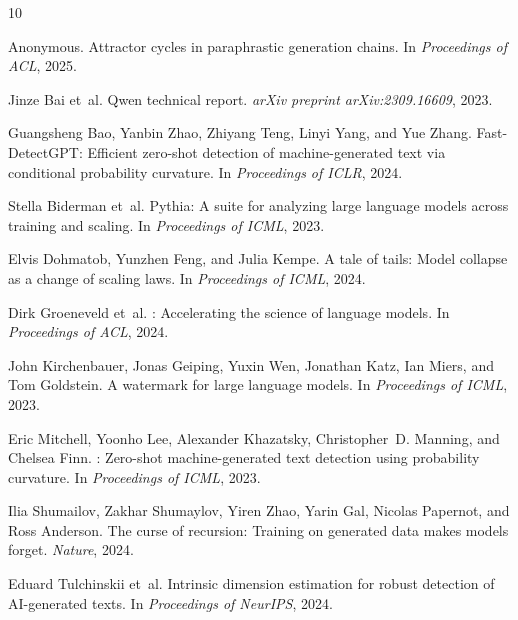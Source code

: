 \documentclass[letterpaper]{article}
\begin{document}


\begin{thebibliography}{10}

Anonymous.
\newblock Attractor cycles in paraphrastic generation chains.
\newblock In \emph{Proceedings of ACL}, 2025.

Jinze Bai et~al.
\newblock Qwen technical report.
\newblock \emph{arXiv preprint arXiv:2309.16609}, 2023.

Guangsheng Bao, Yanbin Zhao, Zhiyang Teng, Linyi Yang, and Yue Zhang.
\newblock Fast-{D}etect{GPT}: Efficient zero-shot detection of machine-generated text via conditional probability curvature.
\newblock In \emph{Proceedings of ICLR}, 2024.

Stella Biderman et~al.
\newblock Pythia: A suite for analyzing large language models across training and scaling.
\newblock In \emph{Proceedings of ICML}, 2023.

Elvis Dohmatob, Yunzhen Feng, and Julia Kempe.
\newblock A tale of tails: Model collapse as a change of scaling laws.
\newblock In \emph{Proceedings of ICML}, 2024.

Dirk Groeneveld et~al.
: Accelerating the science of language models.
\newblock In \emph{Proceedings of ACL}, 2024.

John Kirchenbauer, Jonas Geiping, Yuxin Wen, Jonathan Katz, Ian Miers, and Tom Goldstein.
\newblock A watermark for large language models.
\newblock In \emph{Proceedings of ICML}, 2023.

Eric Mitchell, Yoonho Lee, Alexander Khazatsky, Christopher~D. Manning, and Chelsea Finn.
: Zero-shot machine-generated text detection using probability curvature.
\newblock In \emph{Proceedings of ICML}, 2023.

Ilia Shumailov, Zakhar Shumaylov, Yiren Zhao, Yarin Gal, Nicolas Papernot, and Ross Anderson.
\newblock The curse of recursion: Training on generated data makes models forget.
\newblock \emph{Nature}, 2024.

Eduard Tulchinskii et~al.
\newblock Intrinsic dimension estimation for robust detection of {AI}-generated texts.
\newblock In \emph{Proceedings of NeurIPS}, 2024.

\end{thebibliography}
\end{document}
